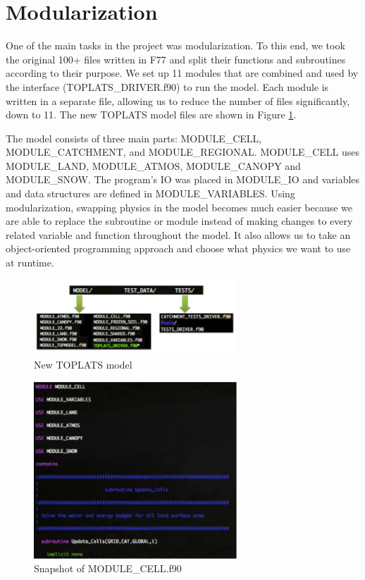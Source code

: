 \documentclass[pdftex,12pt,a4paper]{article}
\begin{document}
\section{Modularization}
One of the main tasks in the project was modularization. To this end, we took the original 100+ files written in F77 and split their functions and subroutines according to their purpose.  We set up 11 modules that are combined and used by the interface (TOPLATS\_DRIVER.f90) to run the model. Each module is written in a separate file, allowing us to reduce the number of files significantly, down to 11.  The new TOPLATS model files are shown in Figure \ref{Modules1}. 

\vspace{1em}

The model consists of three main parts: MODULE\_CELL, MODULE\_CATCHMENT, and MODULE\_REGIONAL. MODULE\_CELL uses MODULE\_LAND, MODULE\_ATMOS, MODULE\_CANOPY and MODULE\_SNOW. The program's IO was placed in MODULE\_IO and variables and data structures are defined in MODULE\_VARIABLES. Using modularization, swapping physics in the model becomes much easier because we are able to replace the subroutine or module instead of making changes to every related variable and function throughout the model. It also allows us to take an object-oriented programming approach and choose what physics we want to use at runtime.

\begin{figure}[h]
	\centering
	\includegraphics[width=3.0in]{Figures/Modules1.png}
	\caption{New TOPLATS model}
	\label{Modules1}
\end{figure}

\begin{figure}[h]
	\centering
	\includegraphics[width=3.0in]{Figures/Modules2.png}
	\caption{Snapshot of MODULE\_CELL.f90}
	\label{Modules2}
\end{figure}
\end{document}
